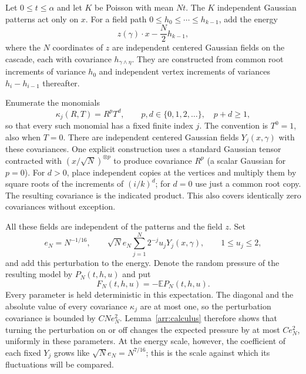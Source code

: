 Let $0\le t\le\alpha$ and let $K$ be Poisson with mean $Nt$.
The $K$ independent Gaussian patterns act only on $x$. For a
field path $0\le h_0\le\cdots\le h_{k-1}$, add the energy
\[
 z(\gamma)\cdot x-\frac N2h_{k-1},
\]
where the $N$ coordinates of $z$ are independent centered
Gaussian fields on the cascade, each with covariance
$h_{\gamma\wedge\eta}$. They are constructed from common root
increments of variance $h_0$ and independent vertex increments
of variances $h_i-h_{i-1}$ thereafter.

Enumerate the monomials
\[
 \kappa_j(R,T)=R^pT^d,
 \qquad p,d\in\{0,1,2,\ldots\},\quad p+d\ge1,
\]
so that every such monomial has a fixed finite index $j$.
The convention is $T^0=1$, also when $T=0$.
There are independent centered Gaussian fields $Y_j(x,\gamma)$
with these covariances. One explicit construction uses a standard
Gaussian tensor contracted with $(x/\sqrt N)^{\otimes p}$
to produce covariance $R^p$ (a scalar Gaussian for $p=0$).
For $d>0$, place independent copies at the vertices and multiply
them by square roots of the increments of $(i/k)^d$; for
$d=0$ use just a common root copy. The resulting covariance is
the indicated product. This also covers identically zero
covariances without exception.

All these fields are independent of the patterns and the field
$z$. Set
\begin{equation}
\label{upper:perturbation}
 e_N=N^{-1/16},\qquad
 \sqrt N e_N\sum_{j=1}^N2^{-j}u_jY_j(x,\gamma),
 \qquad 1\le u_j\le2,
\end{equation}
and add this perturbation to the energy. Denote the random
pressure of the resulting model by $P_N(t,h,u)$ and put
\begin{equation}
\label{upper:F}
 F_N(t,h,u)=-\mathbb E P_N(t,h,u).
\end{equation}
Every parameter is held deterministic in this expectation.
The diagonal and the absolute value of every covariance
$\kappa_j$ are at most one, so the perturbation covariance is
bounded by $CNe_N^2$. Lemma~\ref{arr:calculus} therefore shows
that turning the perturbation on or off changes the expected
pressure by at most $Ce_N^2$, uniformly in these parameters.
At the energy scale, however, the coefficient of each fixed $Y_j$
grows like $\sqrt N e_N=N^{7/16}$; this is the scale against
which its fluctuations will be compared.

